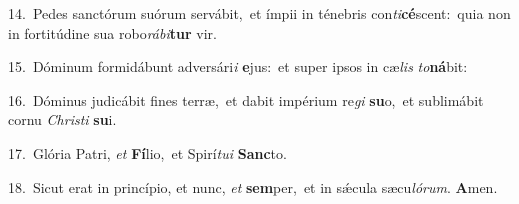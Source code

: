{\numbfont\textcolor{\numbcolor}{14.}}~Pedes sanctórum suórum servábit,~\dagger et ímpii in ténebris con\-\textit{ti}\-\textbf{cé}scent:~\star quia non in fortitúdine sua robo\-\textit{rá}\-\textit{bi}\textbf{tur} vir.\par
{\numbfont\textcolor{\numbcolor}{15.}}~Dóminum formidábunt adversári\textit{i} \textbf{e}\-jus:~\star et super ipsos in cæ\textit{lis} \textit{to}\-\textbf{ná}bit:\par
{\numbfont\textcolor{\numbcolor}{16.}}~Dóminus judicábit fines terræ,~\dagger et dabit impérium re\textit{gi} \textbf{su}\-o,~\star et sublimábit cornu \textit{Chris}\-\textit{ti} \textbf{su}\-i.\par
{\numbfont\textcolor{\numbcolor}{17.}}~Glória Patri, \textit{et} \textbf{Fí}\-lio,~\star et Spirí\-\textit{tu}\-\textit{i} \textbf{Sanc}\-to.\par
{\numbfont\textcolor{\numbcolor}{18.}}~Sicut erat in princípio, et nunc, \textit{et} \textbf{sem}\-per,~\star et in sǽcula sæcu\-\textit{ló}\-\textit{rum}. \textbf{A}\-men.\par
